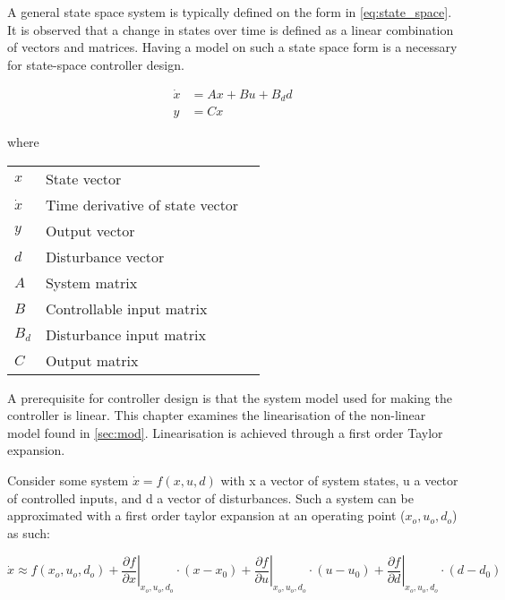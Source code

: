 A general state space system is typically defined on the form in \cref{eq:state_space}. It is observed that a change in states over time is defined as a linear combination of vectors and matrices. Having a model on such a state space form is a necessary for state-space controller design.

\begin{equation} \label{eq:state_space}
	\begin{split}
		\dot{x} & = Ax + Bu + B_dd \\
		y 		& = Cx
	\end{split}
\end{equation}

where

\begin{center}
	\begin{tabular}{l p{8cm} l}
		$x$       & State vector                    &  \\
		$\dot{x}$ & Time derivative of state vector &  \\
		$y$       & Output vector                   &  \\
		$d$       & Disturbance vector              &  \\
		$A$       & System matrix                   &  \\
		$B$       & Controllable input matrix       &  \\
		$B_d$     & Disturbance input matrix        &  \\
		$C$       & Output matrix                   &
	\end{tabular}
\end{center}

A prerequisite for controller design is that the system model used for making the controller is linear. This chapter examines the linearisation of the non-linear model found in \cref{sec:mod}. Linearisation is achieved through a first order Taylor expansion.

Consider some system $\dot{x} = f(x,u,d)$ with x a vector of system states, u a vector of controlled inputs, and d a vector of disturbances. Such a system can be approximated with a first order taylor expansion at an operating point ($x_o, u_o, d_o$) as such:

\begin{equation} \label{eq:taylor}
	\dot{x}   \approx   f(x_o, u_o, d_o)   +
	\left. \dfrac{\partial f}{\partial x} \right |_{x_o, u_o, d_o} \cdot (x-x_0) +
	\left. \dfrac{\partial f}{\partial u} \right |_{x_o, u_o, d_o} \cdot (u-u_0) +
	\left. \dfrac{\partial f}{\partial d} \right |_{x_o, u_o, d_o} \cdot (d-d_0)
\end{equation}

